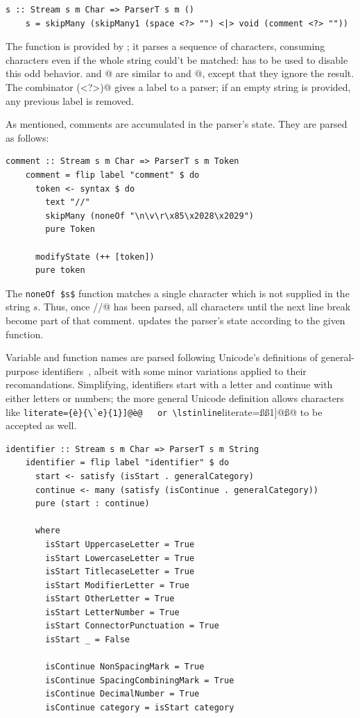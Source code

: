 \documentclass[UdineBachThesis,american,11pt,draft]{PhdThesis}
\begin{document}
  \begin{lstlisting}[gobble=4,basicstyle=\ttfamily\small]
    s :: Stream s m Char => ParserT s m ()
    s = skipMany (skipMany1 (space <?> "") <|> void (comment <?> ""))
  \end{lstlisting}

  The function \lstinline@string@ is provided by \lstinline@parsec@; it parses a
  sequence of characters, consuming characters even if the whole string could't
  be matched: \lstinline@try@ has to be used to disable this odd behavior.
  \lstinline@skipMany@ and @ are similar to \lstinline@many@
  and @, except that they ignore the result. The combinator
  \lstinline@(<?>)@ gives a label to a parser; if an empty string is provided,
  any previous label is removed.

  As mentioned, comments are accumulated in the parser's state. They are parsed
  as follows:

  \begin{lstlisting}[gobble=4,basicstyle=\ttfamily\small]
    comment :: Stream s m Char => ParserT s m Token
    comment = flip label "comment" $ do
      token <- syntax $ do
        text "//"
        skipMany (noneOf "\n\v\r\x85\x2028\x2029")
        pure Token

      modifyState (++ [token])
      pure token
  \end{lstlisting}

  The \lstinline[mathescape]@noneOf $s$@ function matches a single character
  which is not supplied in the string $s$. Thus, once \lstinline@//@ has been
  parsed, all characters until the next line break become part of that comment.
  \lstinline@modifyState@ updates the parser's state according to the given
  function.

  Variable and function names are parsed following Unicode's definitions of
  general-purpose identifiers~\cite{identifier-syntax}, albeit with some minor
  variations applied to their recomandations. Simplifying, identifiers start
  with a letter and continue with either letters or numbers; the more general
  Unicode definition allows characters like \lstinline[literate={è}{\`e}{1}]@è@
  or \lstinline[literate={ß}{\ss}{1}]@ß@ to be accepted as well.

  \begin{lstlisting}[gobble=4,basicstyle=\ttfamily\small]
    identifier :: Stream s m Char => ParserT s m String
    identifier = flip label "identifier" $ do
      start <- satisfy (isStart . generalCategory)
      continue <- many (satisfy (isContinue . generalCategory))
      pure (start : continue)

      where
        isStart UppercaseLetter = True
        isStart LowercaseLetter = True
        isStart TitlecaseLetter = True
        isStart ModifierLetter = True
        isStart OtherLetter = True
        isStart LetterNumber = True
        isStart ConnectorPunctuation = True
        isStart _ = False

        isContinue NonSpacingMark = True
        isContinue SpacingCombiningMark = True
        isContinue DecimalNumber = True
        isContinue category = isStart category
  \end{lstlisting}
\end{document}
